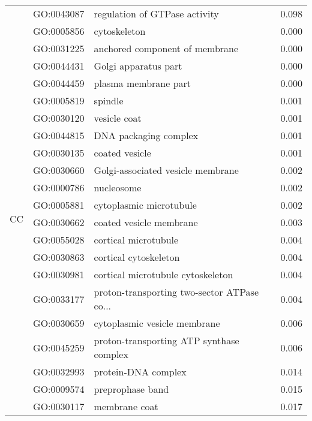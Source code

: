 \begin{longtable}{lllr}
   & GO:0043087 &                regulation of GTPase activity &         0.098 \\
\cline{1-4}
\multirow{44}{*}{CC} & GO:0005856 &                                 cytoskeleton &         0.000 \\
   & GO:0031225 &               anchored component of membrane &         0.000 \\
   & GO:0044431 &                         Golgi apparatus part &         0.000 \\
   & GO:0044459 &                         plasma membrane part &         0.000 \\
   & GO:0005819 &                                      spindle &         0.001 \\
   & GO:0030120 &                                 vesicle coat &         0.001 \\
   & GO:0044815 &                        DNA packaging complex &         0.001 \\
   & GO:0030135 &                               coated vesicle &         0.001 \\
   & GO:0030660 &            Golgi-associated vesicle membrane &         0.002 \\
   & GO:0000786 &                                   nucleosome &         0.002 \\
   & GO:0005881 &                      cytoplasmic microtubule &         0.002 \\
   & GO:0030662 &                      coated vesicle membrane &         0.003 \\
   & GO:0055028 &                         cortical microtubule &         0.004 \\
   & GO:0030863 &                        cortical cytoskeleton &         0.004 \\
   & GO:0030981 &            cortical microtubule cytoskeleton &         0.004 \\
   & GO:0033177 &  proton-transporting two-sector ATPase co... &         0.004 \\
   & GO:0030659 &                 cytoplasmic vesicle membrane &         0.006 \\
   & GO:0045259 &     proton-transporting ATP synthase complex &         0.006 \\
   & GO:0032993 &                          protein-DNA complex &         0.014 \\
   & GO:0009574 &                             preprophase band &         0.015 \\
   & GO:0030117 &                                membrane coat &         0.017 \\

\end{longtable}
